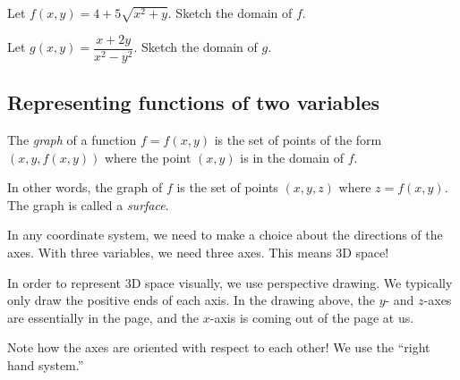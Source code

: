 \begin{ex}
    Let $f(x,y)=4+5\sqrt{x^2+y}$. Sketch the domain of $f$.
\end{ex}

\vfill

\begin{ex}
    Let $g(x,y)=\dfrac{x+2y}{x^2-y^2}$. Sketch the domain of $g$.
\end{ex}

\vfill 

\pagebreak 

\subsection{Representing functions of two variables}
\begin{defn}
    The \emph{graph} of a function $f=f(x,y)$ is the set of points of the form $(x,y,f(x,y))$ where the point $(x,y)$ is in the domain of $f$.
\end{defn}
In other words, the graph of $f$ is the set of points $(x,y,z)$ where $z=f(x,y)$. The graph is called a \emph{surface}.

In any coordinate system, we need to make a choice about the directions of the axes. With three variables, we need three axes. This means 3D space!
\vspace{2in}

In order to represent 3D space visually, we use perspective drawing. We typically only draw the positive ends of each axis. In the drawing above, the $y$- and $z$-axes are essentially in the page, and the $x$-axis is coming out of the page at us.

Note how the axes are oriented with respect to each other! We use the ``right hand system.''%

